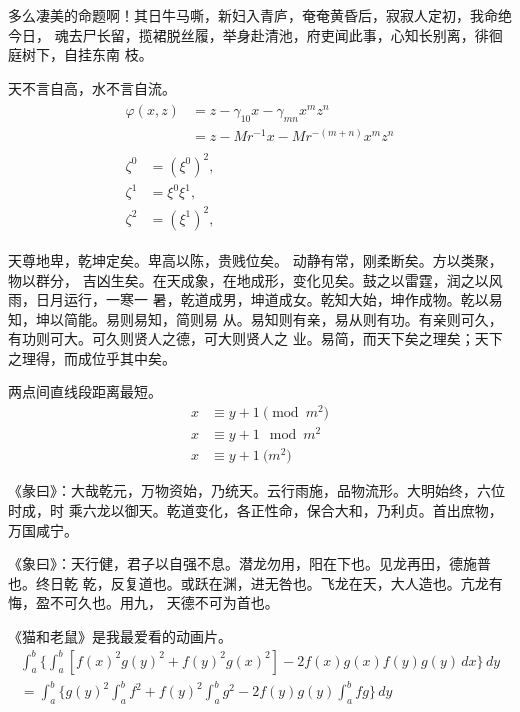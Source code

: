 多么凄美的命题啊！其日牛马嘶，新妇入青庐，奄奄黄昏后，寂寂人定初，我命绝今日，
魂去尸长留，揽裙脱丝履，举身赴清池，府吏闻此事，心知长别离，徘徊庭树下，自挂东南
枝。

\begin{remark}
天不言自高，水不言自流。
\begin{gather*}
\begin{split}
\varphi(x,z)
&=z-\gamma_{10}x-\gamma_{mn}x^mz^n\\
&=z-Mr^{-1}x-Mr^{-(m+n)}x^mz^n
\end{split}\\[6pt]
\begin{align} \zeta^0&=(\xi^0)^2,\\
\zeta^1 &=\xi^0\xi^1,\\
\zeta^2 &=(\xi^1)^2,
\end{align}
\end{gather*}
\end{remark}

天尊地卑，乾坤定矣。卑高以陈，贵贱位矣。 动静有常，刚柔断矣。方以类聚，物以群分，
吉凶生矣。在天成象，在地成形，变化见矣。鼓之以雷霆，润之以风雨，日月运行，一寒一
暑，乾道成男，坤道成女。乾知大始，坤作成物。乾以易知，坤以简能。易则易知，简则易
从。易知则有亲，易从则有功。有亲则可久，有功则可大。可久则贤人之德，可大则贤人之
业。易简，而天下矣之理矣；天下之理得，而成位乎其中矣。

\begin{axiom}
两点间直线段距离最短。
\begin{align}
x&\equiv y+1\pmod{m^2}\\
x&\equiv y+1\mod{m^2}\\
x&\equiv y+1\pod{m^2}
\end{align}
\end{axiom}

《彖曰》：大哉乾元，万物资始，乃统天。云行雨施，品物流形。大明始终，六位时成，时
乘六龙以御天。乾道变化，各正性命，保合大和，乃利贞。首出庶物，万国咸宁。

《象曰》：天行健，君子以自强不息。潜龙勿用，阳在下也。见龙再田，德施普也。终日乾
乾，反复道也。或跃在渊，进无咎也。飞龙在天，大人造也。亢龙有悔，盈不可久也。用九，
天德不可为首也。 　　

\begin{lemma}
《猫和老鼠》是我最爱看的动画片。
\begin{multline*}%
\int_a^b\biggl\{\int_a^b[f(x)^2g(y)^2+f(y)^2g(x)^2]
 -2f(x)g(x)f(y)g(y)\,dx\biggr\}\,dy \\
 =\int_a^b\biggl\{g(y)^2\int_a^bf^2+f(y)^2
  \int_a^b g^2-2f(y)g(y)\int_a^b fg\biggr\}\,dy
\end{multline*}
\end{lemma}

